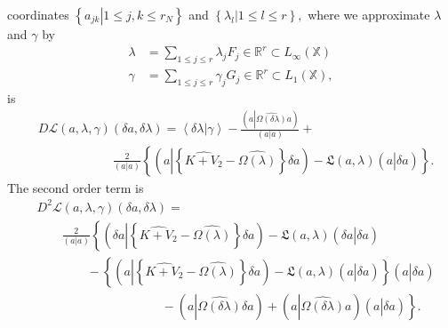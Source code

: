 \documentclass[aps,preprint]{revtex4}%
\begin{document}
coordinates $\left\{  \left.  a_{jk}\right\vert 1\leq j,k\leq r_{N}\right\}  $
and $\left\{  \left.  \lambda_{l}\right\vert 1\leq l\leq r\right\}  ,$ where
we approximate $\lambda$ and $\gamma$ by
\begin{align}
\lambda &  =\sum_{1\leq j\leq r}\lambda_{j}F_{j}\in\mathbb{R}^{r}\subset
L_{\infty}\left(  \mathbb{X}\right) \nonumber\\
\gamma &  =\sum_{1\leq j\leq r}\gamma_{j}G_{j}\in\mathbb{R}^{r}\subset
L_{1}\left(  \mathbb{X}\right)  ,
\end{align}
is
\begin{align}
&  D\mathcal{L}\left(  a,\lambda,\gamma\right)  \left(  \delta a,\delta
\lambda\right)  =\left\langle \delta\lambda\left\vert \overset{}{\gamma
}\right.  \right\rangle -\frac{\left(  a\left\vert \widehat{\Omega\left(
\delta\lambda\right)  }\right.  a\right)  }{\left(  a\left\vert \overset{}%
{a}\right.  \right)  }+\nonumber\\
&  \qquad\qquad\qquad\frac{2}{\left(  a\left\vert a\right.  \right)  }\left\{
\left(  a\left\vert \left\{  \widehat{K+V_{2}}-\widehat{\Omega\left(
\lambda\right)  }\right\}  \right.  \delta a\right)  -\mathfrak{L}\left(
a,\lambda\right)  \left(  a\left\vert \overset{}{\delta a}\right.  \right)
\right\}  .
\end{align}
The second order term is
\begin{align}
&  D^{2}\mathcal{L}\left(  a,\lambda,\gamma\right)  \left(  \delta
a,\delta\lambda\right)  =\nonumber\\
&  \qquad\frac{2}{\left(  a\left\vert a\right.  \right)  }\left\{  \left(
\delta a\left\vert \left\{  \widehat{K+V_{2}}-\widehat{\Omega\left(
\lambda\right)  }\right\}  \right.  \delta a\right)  -\mathfrak{L}\left(
a,\lambda\right)  \left(  \delta a\left\vert \overset{}{\delta a}\right.
\right)  \right. \nonumber\\
&  \qquad\qquad-\left\{  \left(  a\left\vert \left\{  \widehat{K+V_{2}%
}-\widehat{\Omega\left(  \lambda\right)  }\right\}  \right.  \delta a\right)
-\mathfrak{L}\left(  a,\lambda\right)  \left(  a\left\vert \overset{}{\delta
a}\right.  \right)  \right\}  \left(  a\left\vert \overset{}{\delta a}\right.
\right) \nonumber\\
&  \qquad\qquad\qquad\qquad\qquad-\left.  \left(  a\left\vert \widehat
{\Omega\left(  \delta\lambda\right)  }\right.  \delta a\right)  +\left(
a\left\vert \widehat{\Omega\left(  \delta\lambda\right)  }\right.  a\right)
\left(  a\left\vert \overset{}{\delta a}\right.  \right)  \right\}  .
\end{align}
\end{document}
